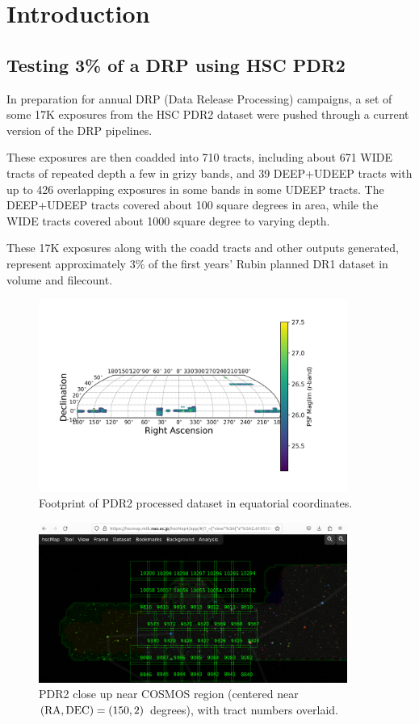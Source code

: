 \section{Introduction}\label{sec:intro}

\subsection{Testing 3\% of a DRP using HSC PDR2}

In preparation for annual DRP (Data Release Processing) campaigns, 
a set of some 17K exposures from the HSC PDR2 dataset were pushed through
a current version of the DRP pipelines.

These exposures are then coadded into 710 tracts, including about 671
WIDE tracts of repeated depth a few in grizy bands, and 39 DEEP+UDEEP 
tracts with up to 426 overlapping exposures in some bands in some UDEEP tracts.
The DEEP+UDEEP tracts covered about 100 square degrees in area, while the
WIDE tracts covered about 1000 square degree to varying depth.

These 17K exposures along with the coadd tracts and other
outputs generated, represent approximately 3\% of the first 
years' Rubin planned DR1 dataset in volume and filecount.

\begin{figure}[h]
\includegraphics[width=0.9\textwidth]{r_maglim_pdr2.png}
	 \caption{Footprint of PDR2 processed dataset in equatorial coordinates.  \label{fig:footprint1}}
\end{figure}

 \begin{figure}[h]
 \includegraphics[width=0.9\textwidth]{hscmaptractcosmos.png}
	 \caption{PDR2 close up near COSMOS region (centered near $\rm (RA,DEC) = (150, 2)$ degrees), with tract numbers overlaid.  \label{fig:hscmaptract}}
 \end{figure}

